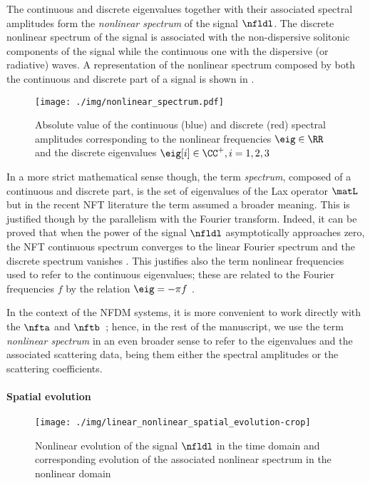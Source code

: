 The continuous and discrete eigenvalues together with their associated spectral
amplitudes form the \textit{nonlinear spectrum} of the signal $\nfldl$. The
discrete nonlinear spectrum of the signal is associated with the non-dispersive solitonic
components of the signal while the continuous one with the dispersive (or
radiative) waves. A representation of the nonlinear spectrum  composed by both the continuous and discrete part of a signal is shown in .

\begin{figure}[t]
  \centering
  \texttt{[image: ./img/nonlinear\_spectrum.pdf]}
  \caption{Absolute value of the continuous (blue) and discrete (red) spectral amplitudes corresponding to the nonlinear frequencies $\eig \in \RR$ and the discrete eigenvalues $\eig[i] \in \CC^+, i=1, 2, 3$}
  \label{fig:nonlinear_spectrum}
\end{figure}

In a more strict mathematical sense though, the term \textit{spectrum},
composed of a continuous and discrete part, is the set of eigenvalues of the Lax
operator $\matL$ \cite{lax1968integrals, shabat1972exact} but in the recent \ac{NFT}
literature \cite{prilepsky2013nonlinear,Turitsyn2017,Le2017} the term assumed a
broader meaning.
This is justified though by the parallelism with the Fourier transform.
Indeed, it can be proved that when the power of the signal $\nfldl$ asymptotically approaches
zero, the \ac{NFT} continuous spectrum converges to the linear Fourier spectrum
and the discrete spectrum vanishes \cite{prilepsky2013nonlinear}. This justifies also the term
nonlinear frequencies used to refer to the continuous eigenvalues; these are related to the Fourier frequencies $f$ by the relation $\eig = - \pi f $ \cite{prilepsky2013nonlinear}.



In the context of the \ac{NFDM} systems, it is more convenient to work
directly with the \scatcoef{} $\nfta$ and $\nftb$~\cite{HongKong,WahlsECOC2017};
hence, in the rest of the manuscript, we use the term \textit{nonlinear
spectrum} in an even broader sense to refer to the eigenvalues and the associated
scattering data, being them either the spectral amplitudes or the scattering
coefficients.

\paragraph{Spatial evolution}
\begin{figure}[t]
  \centering
  \texttt{[image: ./img/linear\_nonlinear\_spatial\_evolution-crop]}
  \caption{Nonlinear evolution of the signal $\nfldl$ in the time domain and corresponding evolution of the associated nonlinear spectrum in the nonlinear domain}
  \label{fig:nft_lin_nonlin_evolution}
\end{figure}

